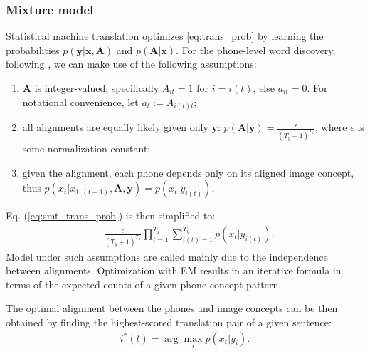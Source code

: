 \documentclass[journal]{IEEEtran}
\begin{document}
\subsubsection{Mixture model}
Statistical machine translation optimizes \ref{eq:trans_prob} by learning the probabilities $p(\mathbf{y}|\mathbf{x}, \mathbf{A})$ and $p(\mathbf{A}|\mathbf{x})$. For the phone-level word discovery, following \cite{Brown92}, we can make use of the following assumptions:
\begin{enumerate}
    \item $\mathbf{A}$ is integer-valued, specifically $A_{it}=1$ for $i=i(t)$, else $a_{it}=0$. For notational convenience, let $a_t := A_{i(t) t}$; 
    \item all alignments are equally likely given only $\mathbf{y}$: $p(\mathbf A|\mathbf y) = \frac{\epsilon}{(T_y+1)^{T_x}}$, where $\epsilon$ is some normalization constant;
    \item given the alignment,
each phone depends only on its aligned image concept, thus
$p(x_t|x_{1:(t-1)},\mathbf{A},\mathbf{y})=p(x_t|y_{i(t)})$,
\end{enumerate}
Eq. (\ref{eq:smt_trans_prob}) is then simplified to:
\begin{align}
    &\frac{\epsilon}{(T_y+1)^{T_x}}\prod_{t=1}^{T_x}\sum_{i(t)=1}^{T_y} p(x_t|y_{i(t)}).
\end{align}
Model under such assumptions are called \cite{mixture model} mainly due to the independence between alignments. Optimization with EM results in 
an iterative formula
in terms of the expected counts of a given phone-concept pattern.

The optimal alignment between the phones and image concepts can be then obtained by finding the highest-scored translation pair of a given sentence:
\begin{align}\label{eq:smt_alignment}
    i^*(t) = \arg\max_i p(x_t|y_i).
\end{align}

\end{document}
